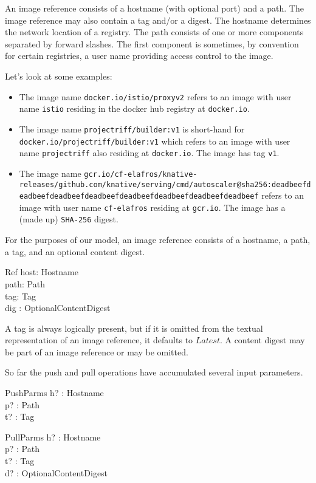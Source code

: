 \documentclass[a4paper,twoside,12pt]{article}
\begin{document}
An image reference consists of a hostname (with optional port) and a path. The image reference may also contain a tag and/or a digest. The hostname determines the network location of a registry. The path consists of one or more components separated by forward slashes. The first component is sometimes, by convention for certain registries, a user name providing access control to the image.

Let's look at some examples:
\begin{itemize}
\item The image name \texttt{docker.io/istio/proxyv2} refers to an image with user name \texttt{istio} residing in the docker hub registry at \texttt{docker.io}.

\item The image name \texttt{projectriff/builder:v1} is short-hand for\linebreak
\texttt{docker.io/projectriff/builder:v1} which refers to an image with user name \texttt{projectriff} also residing at \texttt{docker.io}. The image has tag \texttt{v1}.

\item The image name \texttt{gcr.io/cf-elafros/knative-releases/github.com}\linebreak\texttt{/knative/serving/cmd/autoscaler@sha256:deadbeefdeadbeef}\linebreak\texttt{deadbeefdeadbeefdeadbeefdeadbeefdeadbeefdeadbeef} refers to an image with user name \texttt{cf-elafros} residing at \texttt{gcr.io}. The image has a (made up) \texttt{SHA-256} digest.
\end{itemize}

For the purposes of our model, an image reference consists of a hostname, a path, a tag, and an optional content digest.
\begin{schema}{Ref}
    host: Hostname \\
    path: Path \\
    tag: Tag \\
    dig : OptionalContentDigest \\
\end{schema}
A tag is always logically present, but if it is omitted from the textual representation of an image reference, it defaults to $Latest$.
A content digest may be part of an image reference or may be omitted.

So far the push and pull operations have accumulated several input parameters.
\begin{schema}{PushParms}
    h? : Hostname \\
    p? : Path \\
    t? : Tag \\
\end{schema}
\begin{schema}{PullParms}
    h? : Hostname \\
    p? : Path \\
    t? : Tag \\
    d? : OptionalContentDigest \\
\end{schema}
\end{document}
